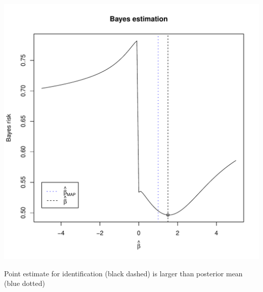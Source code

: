 \documentclass{beamer}
\begin{document}
\begin{frame}
\begin{center}
\includegraphics[scale = .4]{toy_est.pdf}
\end{center}
Point estimate for identification (black dashed) is larger than posterior mean (blue dotted)
\end{frame}
\end{document}
